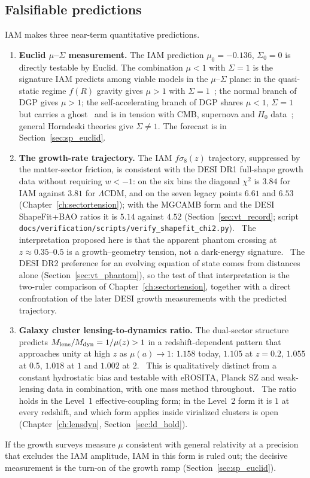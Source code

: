 \subsection{Falsifiable predictions}
IAM makes three near-term quantitative predictions.
\begin{enumerate}
\item \textbf{Euclid $\mu$--$\Sigma$ measurement.} The IAM prediction $\mu_0=-0.136$, $\Sigma_0=0$ is directly testable by Euclid. The combination $\mu<1$
with $\Sigma=1$ is the signature IAM predicts among viable models in the $\mu$--$\Sigma$ plane: in the quasi-static regime $f(R)$ gravity gives $\mu>1$ with
$\Sigma=1$~\cite{PogosianSilvestri2016}; the normal branch of DGP gives $\mu>1$; the self-accelerating branch of DGP shares $\mu<1$, $\Sigma=1$ but carries a
ghost~\cite{Koyama2007} and is in tension with CMB, supernova and $H_0$ data~\cite{Fang2008}; general Horndeski theories give $\Sigma\neq1$. The forecast is in Section~\ref{sec:sp_euclid}. \prediction
\item \textbf{The growth-rate trajectory.} The IAM $f\sigma_8(z)$ trajectory, suppressed by the matter-sector friction, is consistent with the DESI DR1
full-shape growth data without requiring $w<-1$: on the six bins the diagonal $\chi^2$ is $3.84$ for IAM against $3.81$ for $\Lambda$CDM, and on the
seven legacy points $6.61$ and $6.53$ (Chapter~\ref{ch:sectortension}); with the MGCAMB form and the DESI ShapeFit+BAO ratios it is $5.14$ against $4.52$
(Section~\ref{sec:vt_record}; script \texttt{docs/\allowbreak{}verification/\allowbreak{}scripts/\allowbreak{}verify\_shapefit\_chi2.py}). \calc\ The interpretation proposed here is that the apparent phantom crossing at $z\approx0.35$--$0.5$ is a growth--geometry tension, not a
dark-energy signature. \conjecture\ The DESI DR2 preference for an evolving equation of state comes from distances alone (Section~\ref{sec:vt_phantom}), so the
test of that interpretation is the two-ruler comparison of Chapter~\ref{ch:sectortension}, together with a direct confrontation of the later DESI growth
measurements with the predicted trajectory. \openprob
\item \textbf{Galaxy cluster lensing-to-dynamics ratio.} The dual-sector structure predicts $M_{\rm lens}/M_{\rm dyn}=1/\mu(z)>1$ in a redshift-dependent
pattern that approaches unity at high $z$ as $\mu(a)\to1$: $1.158$ today, $1.105$ at $z=0.2$, $1.055$ at $0.5$, $1.018$ at $1$ and $1.002$ at $2$. \calc\ This is
qualitatively distinct from a constant hydrostatic bias and testable with eROSITA, Planck SZ and weak-lensing data in combination, with one mass method
throughout. \prediction\ The ratio holds in the Level~1 effective-coupling form; in the Level~2 form it is $1$ at every redshift, and which form applies
inside virialized clusters is open (Chapter~\ref{ch:lensdyn}, Section~\ref{sec:ld_hold}). \openprob
\end{enumerate}
If the growth surveys measure $\mu$ consistent with general relativity at a precision that excludes the IAM amplitude, IAM in this form is
ruled out; the decisive measurement is the turn-on of the growth ramp (Section~\ref{sec:sp_euclid}). \prediction

